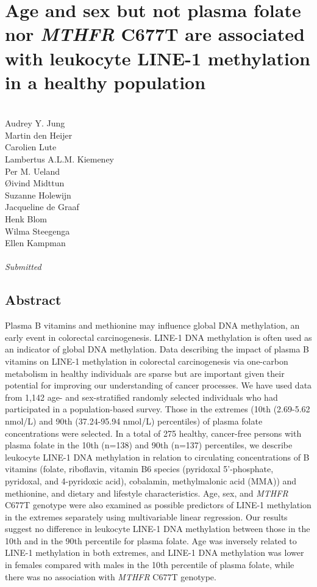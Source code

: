 \chapter{Age and sex but not plasma folate nor \emph{MTHFR} C677T are associated with leukocyte LINE-1 methylation in a healthy population} 
\label{chap3_nbs} 

\quad\\

\noindent
Audrey Y. Jung\\
Martin den Heijer\\
Carolien Lute\\
Lambertus A.L.M. Kiemeney\\
Per M. Ueland\\
{\O}ivind Midttun\\
Suzanne Holewijn\\
Jacqueline de Graaf\\
Henk Blom\\
Wilma Steegenga\\
Ellen Kampman\\

\quad\\
\emph{Submitted}\\


\newpage

\section*{Abstract}

\noindent Plasma B vitamins and methionine may influence global DNA methylation, an early event in colorectal carcinogenesis. LINE-1 DNA methylation is often used as an indicator of global DNA methylation. Data describing the impact of plasma B vitamins on LINE-1 methylation in colorectal carcinogenesis via one-carbon metabolism in healthy individuals are sparse but are important given their potential for improving our understanding of cancer processes. We have used data from 1,142 age- and sex-stratified randomly selected individuals who had participated in a population-based survey. Those in the extremes (10th (2.69-5.62 nmol/L) and 90th (37.24-95.94 nmol/L) percentiles) of plasma folate concentrations were selected. In a total of 275 healthy, cancer-free persons with plasma folate in the 10th (n=138) and 90th (n=137) percentiles, we describe leukocyte LINE-1 DNA methylation in relation to circulating concentrations of B vitamins (folate, riboflavin, vitamin B6 species (pyridoxal 5'-phosphate, pyridoxal, 
and 4-pyridoxic acid), cobalamin, methylmalonic acid (MMA)) and methionine, and dietary and lifestyle characteristics. Age, sex, and \emph{MTHFR} C677T genotype were also examined as possible predictors of LINE-1 methylation in the extremes separately using multivariable linear regression. Our results suggest no difference in leukocyte LINE-1 DNA methylation between those in the 10th and in the 90th percentile for plasma folate. Age was inversely related to LINE-1 methylation in both extremes, and LINE-1 DNA methylation was lower in females compared with males in the 10th percentile of plasma folate, while there was no association with \emph{MTHFR} C677T genotype.


